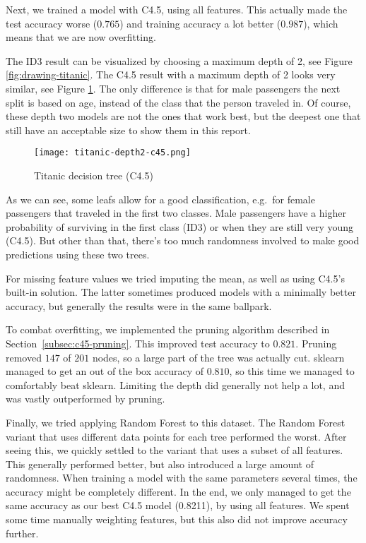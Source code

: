 \documentclass[a4paper]{article}
\begin{document}
Next, we trained a model with C4.5, using all features. This actually made the test accuracy worse ($0.765$) and training accuracy a lot better ($0.987$), which means that we are now overfitting.

The ID3 result can be visualized by choosing a maximum depth of 2, see Figure \ref{fig:drawing-titanic}. The C4.5 result with a maximum depth of 2 looks very similar, see Figure \ref{fig:titanic}. The only difference is that for male passengers the next split is based on age, instead of the class that the person traveled in. Of course, these depth two models are not the ones that work best, but the deepest one that still have an acceptable size to show them in this report.

\begin{figure}[h]
	\texttt{[image: titanic-depth2-c45.png]}
    \caption{Titanic decision tree (C4.5)}
    \label{fig:titanic}
\end{figure}

As we can see, some leafs allow for a good classification, e.g.\ for female passengers that traveled in the first two classes. Male passengers have a higher probability of surviving in the first class (ID3) or when they are still very young (C4.5). But other than that, there's too much randomness involved to make good predictions using these two trees.

For missing feature values we tried imputing the mean, as well as using C4.5's built-in solution. The latter sometimes produced models with a minimally better accuracy, but generally the results were in the same ballpark.

To combat overfitting, we implemented the pruning algorithm described in Section~\ref{subsec:c45-pruning}. This improved test accuracy to $0.821$. Pruning removed $147$ of $201$ nodes, so a large part of the tree was actually cut. sklearn managed to get an out of the box accuracy of $0.810$, so this time we managed to comfortably beat sklearn.
Limiting the depth did generally not help a lot, and was vastly outperformed by pruning.

Finally, we tried applying Random Forest to this dataset. The Random Forest variant that uses different data points for each tree performed the worst. After seeing this, we quickly settled to the variant that uses a subset of all features. This generally performed better, but also introduced a large amount of randomness. When training a model with the same parameters several times, the accuracy might be completely different. In the end, we only managed to get the same accuracy as our best C4.5 model (0.8211), by using all features.  We spent some time manually weighting features, but this also did not improve accuracy further.
\end{document}
